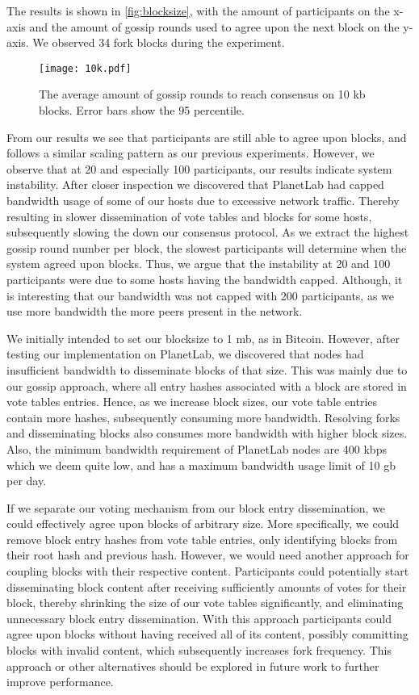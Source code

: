 \documentclass[USenglish]{uit-thesis}
\begin{document}
The results is shown in \autoref{fig:blocksize}, with the amount of participants on the x-axis and the amount of gossip rounds used to agree upon the next block on the y-axis.
We observed 34 fork blocks during the experiment.
\begin{figure}[h]
	\centering
	\texttt{[image: 10k.pdf]}
	\caption[Acheiving consensus with 10 \gls{kb} blocks.]{The average amount of gossip rounds to reach consensus on 10 \gls{kb} blocks.
		Error bars show the 95 percentile.  }
	\label{fig:blocksize}
\end{figure}

From our results we see that participants are still able to agree upon blocks, and follows a similar scaling pattern as our previous experiments.
However, we observe that at 20 and especially 100 participants, our results indicate system instability.
After closer inspection we discovered that PlanetLab had capped bandwidth usage of some of our hosts due to excessive network traffic.
Thereby resulting in slower dissemination of vote tables and blocks for some hosts, subsequently slowing the down our consensus protocol.
As we extract the highest gossip round number per block, the slowest participants will determine when the system agreed upon blocks.
Thus, we argue that the instability at 20 and 100 participants were due to some hosts having the bandwidth capped.
Although, it is interesting that our bandwidth was not capped with 200 participants, as we use more bandwidth the more peers present in the network. 


We initially intended to set our blocksize to 1 \gls{mb}, as in Bitcoin.
However, after testing our implementation on PlanetLab, we discovered that nodes had insufficient bandwidth to disseminate blocks of that size.
This was mainly due to our gossip approach, where all entry hashes associated with a block are stored in vote tables entries. 
Hence, as we increase block sizes, our vote table entries contain more hashes, subsequently consuming more bandwidth.
Resolving forks and disseminating blocks also consumes more bandwidth with higher block sizes.
Also, the minimum bandwidth requirement of PlanetLab nodes are 400 \gls{kbps} which we deem quite low, and has a maximum bandwidth usage limit of 10 \gls{gb} per day.

If we separate our voting mechanism from our block entry dissemination, we could effectively agree upon blocks of arbitrary size.
More specifically, we could remove block entry hashes from vote table entries, only identifying blocks from their root hash and previous hash.
However, we would need another approach for coupling blocks with their respective content.
Participants could potentially start disseminating block content after receiving sufficiently amounts of votes for their block, thereby shrinking the size of our vote tables significantly, and eliminating unnecessary block entry dissemination.
With this approach participants could agree upon blocks without having received all of its content, possibly committing blocks with invalid content, which subsequently increases fork frequency.
This approach or other alternatives should be explored in future work to further improve performance.   
\end{document}
